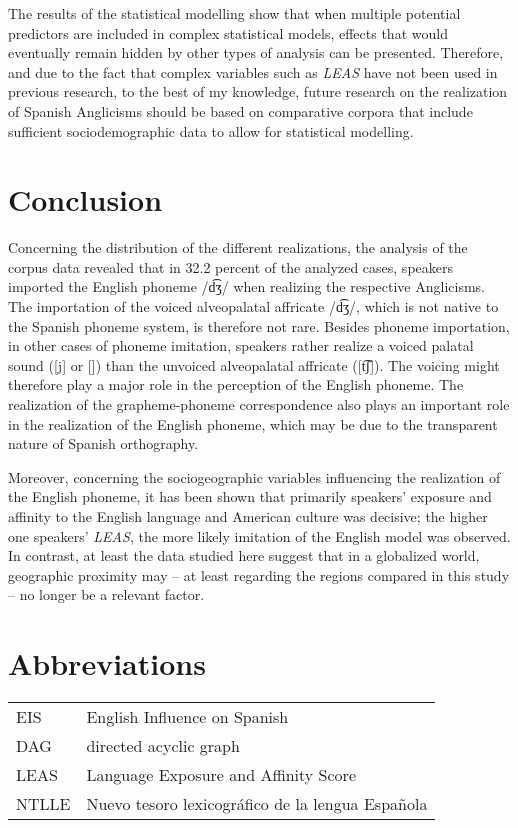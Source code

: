 \documentclass[output=paper]{langscibook}
\begin{document}
The results of the statistical modelling show that when multiple potential predictors are included in complex statistical models, effects that would eventually remain hidden by other types of analysis can be presented. Therefore, and due to the fact that complex variables such as \textit{\gls*{LEAS}} have not been used in previous research, to the best of my knowledge, future research on the realization of Spanish Anglicisms should be based on comparative corpora that include sufficient sociodemographic data to allow for statistical modelling.  

\section{Conclusion}
Concerning the distribution of the different realizations, the analysis of the corpus data revealed that in 32.2 percent of the analyzed cases, speakers imported the English phoneme /d͡ʒ/ when realizing the respective Anglicisms. The importation of the voiced alveopalatal affricate /d͡ʒ/, which is not native to the Spanish phoneme system, is therefore not rare. Besides phoneme importation, in other cases of phoneme imitation, speakers rather realize a voiced palatal sound ([j] or [\textObardotlessj]) than the unvoiced alveopalatal affricate ([t͡ʃ]).
The voicing might therefore play a major role in the perception of the English phoneme. The realization of the grapheme-phoneme correspondence also plays an important role in the realization of the English phoneme, which may be due to the transparent nature of Spanish orthography.

Moreover, concerning the sociogeographic variables influencing the realization of the English phoneme, it has been shown that primarily speakers' exposure and affinity to the English language and American culture was decisive; the higher one speakers' \textit{\gls*{LEAS}}, the more likely imitation of the English model was observed. In contrast, at least the data studied here suggest that in a globalized world, geographic proximity may – at least regarding the regions compared in this study – no longer be a relevant factor.



\section*{Abbreviations}
\begin{tabularx}{\textwidth}{lQ}
EIS& English Influence on Spanish \\
DAG & directed acyclic graph \\
LEAS & Language Exposure and Affinity Score  \\
NTLLE & Nuevo tesoro lexicográfico de la lengua Española \\
\end{tabularx}
\end{document}
